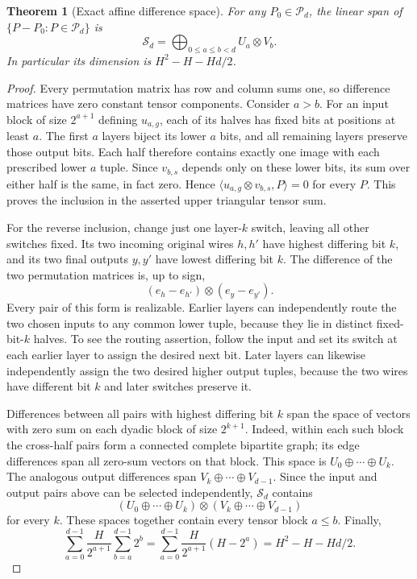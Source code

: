 \documentclass[11pt]{article}
\newtheorem{theorem}{Theorem}
\begin{document}
\begin{theorem}[Exact affine difference space]
For any $P_0\in\mathcal P_d$, the linear span of
$\{P-P_0:P\in\mathcal P_d\}$ is
\[
 \mathcal S_d=\bigoplus_{0\leq a\leq b<d}U_a\otimes V_b.
\]
In particular its dimension is $H^2-H-Hd/2$.
\end{theorem}
\begin{proof}
Every permutation matrix has row and column sums one, so difference
matrices have zero constant tensor components. Consider $a>b$.
For an input block of size $2^{a+1}$ defining $u_{a,g}$, each of its
halves has fixed bits at positions at least $a$. The first $a$ layers
biject its lower $a$ bits, and all remaining layers preserve those
output bits. Each half therefore contains exactly one image with each
prescribed lower $a$ tuple. Since $v_{b,s}$ depends only on these lower
bits, its sum over either half is the same, in fact zero. Hence
$\langle u_{a,g}\otimes v_{b,s},P\rangle=0$ for every $P$.
This proves the inclusion in the asserted upper triangular tensor sum.

For the reverse inclusion, change just one layer-$k$ switch, leaving
all other switches fixed. Its two incoming original wires $h,h'$ have
highest differing bit $k$, and its two final outputs $y,y'$ have lowest
differing bit $k$. The difference of the two permutation matrices is,
up to sign,
\[
 (e_h-e_{h'})\otimes(e_y-e_{y'}).
\]
Every pair of this form is realizable. Earlier layers can independently
route the two chosen inputs to any common lower tuple, because they
lie in distinct fixed-bit-$k$ halves. To see the routing assertion,
follow the input and set its switch at each earlier layer to assign
the desired next bit. Later layers can likewise independently assign
the two desired higher output tuples, because the two wires have
different bit $k$ and later switches preserve it.

Differences between all pairs with highest differing bit $k$ span the
space of vectors with zero sum on each dyadic block of size $2^{k+1}$.
Indeed, within each such block the cross-half pairs form a connected
complete bipartite graph; its edge differences span all zero-sum
vectors on that block. This space is $U_0\oplus\cdots\oplus U_k$.
The analogous output differences span $V_k\oplus\cdots\oplus V_{d-1}$.
Since the input and output pairs above can be selected independently,
$\mathcal S_d$ contains
\[
 (U_0\oplus\cdots\oplus U_k)\otimes
 (V_k\oplus\cdots\oplus V_{d-1})
\]
for every $k$. These spaces together contain every tensor block $a\leq b$.
Finally,
\[
 \sum_{a=0}^{d-1}\frac{H}{2^{a+1}}
       \sum_{b=a}^{d-1}2^b
 =\sum_{a=0}^{d-1}\frac{H}{2^{a+1}}(H-2^a)
 =H^2-H-Hd/2.
\]
\end{proof}
\end{document}
